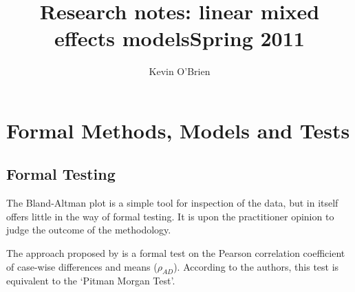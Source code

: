 \documentclass[12pt, a4paper]{report}
\title{Research notes: linear mixed effects models}
\author{ } \date{ }
\theoremstyle{plain}
\theoremstyle{definition}
\theoremstyle{remark}
\begin{document}
	\author{Kevin O'Brien}
	\title{Spring 2011}
	
	
	\tableofcontents
	
	
	
	
	
	
	\chapter{Formal Methods, Models and Tests}
	
	
	
	\section{Formal Testing}
	The Bland-Altman plot is a simple tool for inspection of the data,
	but in itself offers little in the way of formal testing. It is upon the practitioner opinion to judge the outcome of the methodology.
	
	The approach proposed by \citet{BA83} is a formal test on the
	Pearson correlation coefficient of case-wise differences and means
	($\rho_{AD}$). According to the authors, this test is equivalent
	to the `Pitman Morgan Test'. 
	
\end{document}
